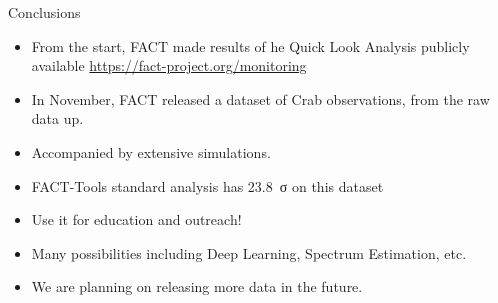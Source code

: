 \documentclass[compress, 9pt, aspectratio=1610, professionalfonts]{beamer}
\begin{document}
\begin{frame}[c]{Conclusions}
  \begin{itemize}
    \item From the start, FACT made results of he Quick Look Analysis publicly available \url{https://fact-project.org/monitoring}
    \item In November, FACT released a dataset of Crab observations, from the raw data up.
    \item Accompanied by extensive simulations.
    \item FACT-Tools standard analysis has \SI{23.8}{σ} on this dataset
    \item Use it for education and outreach!
    \item Many possibilities including Deep Learning, Spectrum Estimation, etc.
    \item We are planning on releasing more data in the future.
  \end{itemize}
\end{frame}
\end{document}
